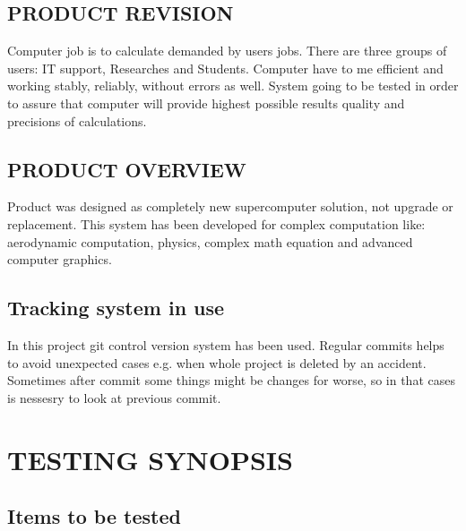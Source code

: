 \documentclass{scrreprt}
\begin{document}
\section{PRODUCT REVISION}
Computer job is to calculate demanded  by users jobs. There are three groups of users: IT support, Researches and Students. Computer have to me efficient and working stably, reliably, without errors as well. System going to be tested in order to assure that computer will provide highest possible results quality and precisions of calculations.




\section{PRODUCT OVERVIEW}

Product was designed as completely new supercomputer solution, not upgrade or replacement. This system has been developed for complex computation like: aerodynamic computation, physics, complex math equation and advanced computer graphics.

\section{Tracking system in use}
In this project git control version system has been used.
Regular commits helps to avoid unexpected cases e.g. when whole project is deleted by an accident. Sometimes after commit some things might be changes for worse, so in that cases is nessesry to look at previous commit.


\chapter{TESTING SYNOPSIS}

\section{Items to be tested}
\end{document}
